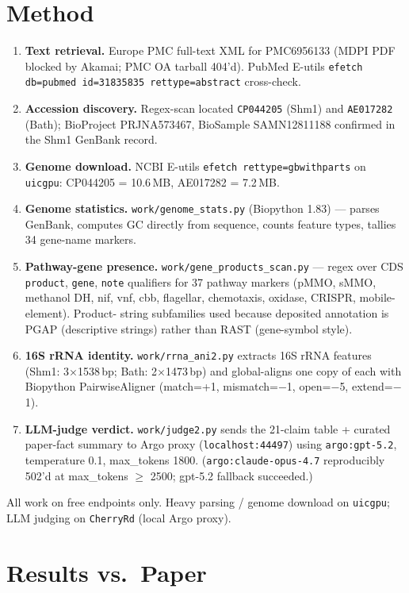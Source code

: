 \documentclass[11pt]{article}
\begin{document}
\section{Method}
\begin{enumerate}
  \item \textbf{Text retrieval.} Europe PMC full-text XML for PMC6956133 (MDPI
    PDF blocked by Akamai; PMC OA tarball 404'd). PubMed E-utils
    \texttt{efetch db=pubmed id=31835835 rettype=abstract} cross-check.
  \item \textbf{Accession discovery.} Regex-scan located \texttt{CP044205}
    (Shm1) and \texttt{AE017282} (Bath); BioProject PRJNA573467, BioSample
    SAMN12811188 confirmed in the Shm1 GenBank record.
  \item \textbf{Genome download.} NCBI E-utils \texttt{efetch rettype=gbwithparts}
    on \texttt{uicgpu}: CP044205 = 10.6\,MB, AE017282 = 7.2\,MB.
  \item \textbf{Genome statistics.} \texttt{work/genome\_stats.py}
    (Biopython 1.83) --- parses GenBank, computes GC directly from sequence,
    counts feature types, tallies 34 gene-name markers.
  \item \textbf{Pathway-gene presence.} \texttt{work/gene\_products\_scan.py}
    --- regex over CDS \texttt{product}, \texttt{gene}, \texttt{note}
    qualifiers for 37 pathway markers (pMMO, sMMO, methanol DH, nif, vnf,
    cbb, flagellar, chemotaxis, oxidase, CRISPR, mobile-element). Product-
    string subfamilies used because deposited annotation is PGAP (descriptive
    strings) rather than RAST (gene-symbol style).
  \item \textbf{16S rRNA identity.} \texttt{work/rrna\_ani2.py} extracts 16S
    rRNA features (Shm1: 3$\times$1538\,bp; Bath: 2$\times$1473\,bp) and
    global-aligns one copy of each with Biopython PairwiseAligner
    (match=+1, mismatch=$-$1, open=$-$5, extend=$-$1).
  \item \textbf{LLM-judge verdict.} \texttt{work/judge2.py} sends the 21-claim
    table + curated paper-fact summary to Argo proxy (\texttt{localhost:44497})
    using \texttt{argo:gpt-5.2}, temperature 0.1, max\_tokens 1800.
    (\texttt{argo:claude-opus-4.7} reproducibly 502'd at max\_tokens $\ge$ 2500;
    gpt-5.2 fallback succeeded.)
\end{enumerate}

All work on free endpoints only. Heavy parsing / genome download on \texttt{uicgpu};
LLM judging on \texttt{CherryRd} (local Argo proxy).

\section{Results vs.\ Paper}
\end{document}
